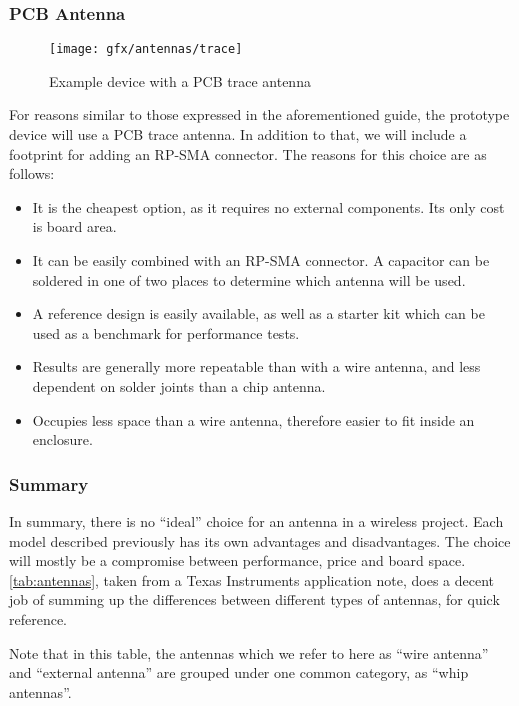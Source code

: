 \subsubsection{PCB Antenna}

\begin{figure}[bth]
  \begin{center}
    \texttt{[image: gfx/antennas/trace]}
  \end{center}
  \caption{Example device with a PCB trace antenna}
  \label{fig:trace-antenna}
\end{figure}

For reasons similar to those expressed in the aforementioned guide, the
prototype device will use a PCB trace antenna. In addition to that, we will
include a footprint for adding an RP-SMA connector. The reasons for this choice
are as follows:

\begin{itemize}
  \item It is the cheapest option, as it requires no external components. Its
    only cost is board area.
  \item It can be easily combined with an RP-SMA connector. A capacitor can be
    soldered in one of two places to determine which antenna will be used. 
  \item A reference design is easily available, as well as a starter kit which
    can be used as a benchmark for performance tests.
  \item Results are generally more repeatable than with a wire antenna, and less
    dependent on solder joints than a chip antenna.
  \item Occupies less space than a wire antenna, therefore easier to fit inside
    an enclosure.
\end{itemize}

\subsubsection{Summary}

In summary, there is no ``ideal'' choice for an antenna in a wireless project.
Each model described previously has its own advantages and disadvantages. The
choice will mostly be a compromise between performance, price and board space.
\autoref{tab:antennas}, taken from a Texas Instruments application
note\citep{slyt296}, does a decent job of summing up the differences between
different types of antennas, for quick reference.

Note that in this table, the antennas which we refer to here as ``wire antenna''
and ``external antenna'' are grouped under one common category, as ``whip
antennas''.

